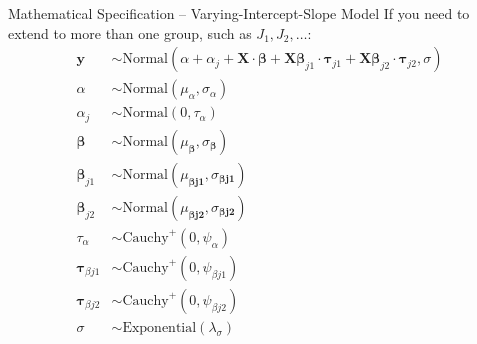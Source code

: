\begin{frame}{Mathematical Specification -- Varying-Intercept-Slope Model}
	If you need to extend to more than one group,
	such as $J_1, J_2, \dots$:
	$$
		\begin{aligned}
			\mathbf{y}                   & \sim \text{Normal}(\alpha + \alpha_j + \mathbf{X} \cdot \boldsymbol{\beta} + \mathbf{X} \boldsymbol{\beta}_{j1} \cdot \boldsymbol{\tau}_{j1} + \mathbf{X} \boldsymbol{\beta}_{j2} \cdot \boldsymbol{\tau}_{j2}, \sigma) \\
			\alpha                       & \sim \text{Normal}(\mu_\alpha, \sigma_\alpha)                                                                                                                                                                           \\
			\alpha_j                     & \sim \text{Normal}(0, \tau_\alpha)                                                                                                                                                                                      \\
			\boldsymbol{\beta}           & \sim \text{Normal}(\mu_{\boldsymbol{\beta}}, \sigma_{\boldsymbol{\beta}})                                                                                                                                               \\
			\boldsymbol{\beta}_{j1}      & \sim \text{Normal}(\mu_{\boldsymbol{\beta j1}}, \sigma_{\boldsymbol{\beta j1}})                                                                                                                                         \\
			\boldsymbol{\beta}_{j2}      & \sim \text{Normal}(\mu_{\boldsymbol{\beta j2}}, \sigma_{\boldsymbol{\beta j2}})                                                                                                                                         \\
			\tau_\alpha                  & \sim \text{Cauchy}^+(0, \psi_{\alpha})                                                                                                                                                                                  \\
			\boldsymbol{\tau}_{\beta j1} & \sim \text{Cauchy}^+(0, \psi_{\beta j1})                                                                                                                                                                                \\
			\boldsymbol{\tau}_{\beta j2} & \sim \text{Cauchy}^+(0, \psi_{\beta j2})                                                                                                                                                                                \\
			\sigma                       & \sim \text{Exponential}(\lambda_\sigma)
		\end{aligned}
	$$
\end{frame}


